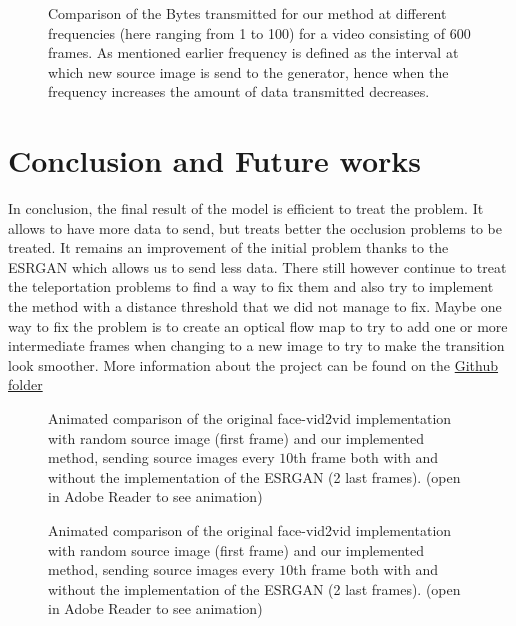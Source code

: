 \documentclass[10pt,twocolumn,letterpaper]{article}
\begin{document}
\begin{figure}[t]
  \centering
   

   \caption{Comparison of the Bytes transmitted for our method at different frequencies (here ranging from 1 to 100) for a video consisting of $600$ frames. As mentioned earlier frequency is defined as the interval at which new source image is send to the generator, hence when the frequency increases the amount of data transmitted decreases.}
   \label{datatransmitted}
\end{figure}

\section{Conclusion and Future works}
In conclusion, the final result of the model is efficient to treat the problem. It allows to have more data to send, but treats better the occlusion problems to be treated. It remains an improvement of the initial problem thanks to the ESRGAN which allows us to send less data. There still however continue to treat the teleportation problems to find a way to fix them and also try to implement the method with a distance threshold that we did not manage to fix. Maybe one way to fix the problem is to create an optical flow map to try to add one or more intermediate frames when changing to a new image to try to make the transition look smoother. More information about the project can be found on the   \href{https://github.com/FlowBigby/Super-Resolution-Multi-Shot-Neural-Talking-Head-Synthesis}{Github folder}


\begin{figure}[t]
  \centering

   \caption{Animated comparison of the original face-vid2vid implementation with random source image (first frame) and our implemented method, sending source images every $10$th frame both with and without the implementation of the ESRGAN (2 last frames). (open in Adobe Reader to see animation)}
    
   \label{comparison1}
\end{figure}


\begin{figure}[t]
  \centering

   \caption{Animated comparison of the original face-vid2vid implementation with random source image (first frame) and our implemented method, sending source images every $10$th frame both with and without the implementation of the ESRGAN (2 last frames). (open in Adobe Reader to see animation)}
    
   \label{Comparison2}
\end{figure}

\newpage
{\small
    
    
}
\end{document}
